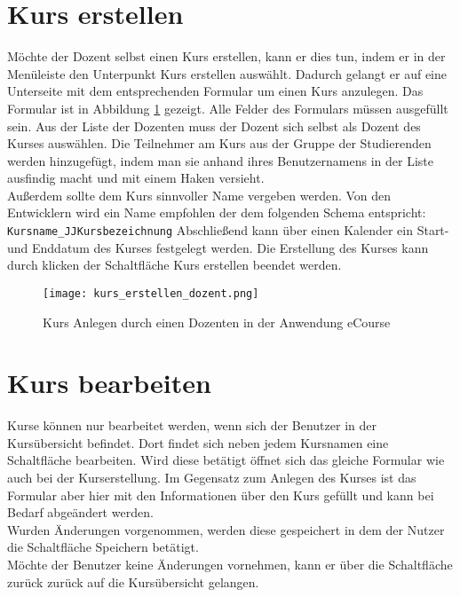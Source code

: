 \section{Kurs erstellen}
Möchte der Dozent selbst einen Kurs erstellen, kann er dies tun, indem er in der Menüleiste den Unterpunkt \glqq Kurs erstellen\grqq{} auswählt. Dadurch gelangt er auf eine Unterseite mit dem entsprechenden Formular um einen Kurs anzulegen. Das Formular ist in Abbildung \ref{fib:kurs_anlegen} gezeigt. Alle Felder des Formulars müssen ausgefüllt sein. Aus der Liste der Dozenten muss der Dozent sich selbst als Dozent des Kurses auswählen.
Die Teilnehmer am Kurs aus der Gruppe der Studierenden werden hinzugefügt, indem man sie anhand ihres Benutzernamens in der Liste ausfindig macht und mit einem Haken versieht. \\
Außerdem sollte dem Kurs sinnvoller Name vergeben werden. Von den Entwicklern wird ein Name empfohlen der dem folgenden Schema entspricht: \\
\verb/Kursname_JJKursbezeichnung/
Abschließend kann über einen Kalender ein Start- und Enddatum des Kurses festgelegt werden. 
Die Erstellung des Kurses kann durch klicken der Schaltfläche \glqq Kurs erstellen\grqq{} beendet werden.

\begin{figure}[h]
\centering
\texttt{[image: kurs\_erstellen\_dozent.png]}
\caption{Kurs Anlegen durch einen Dozenten in der Anwendung eCourse}
\label{fib:kurs_anlegen}
\end{figure}
\section{Kurs bearbeiten}
Kurse können nur bearbeitet werden, wenn sich der Benutzer in der Kursübersicht befindet. Dort findet sich neben jedem Kursnamen eine Schaltfläche \glqq bearbeiten\grqq . Wird diese betätigt öffnet sich das gleiche Formular wie auch bei der Kurserstellung. Im Gegensatz zum Anlegen des Kurses ist das Formular aber hier mit den Informationen über den Kurs gefüllt und kann bei Bedarf abgeändert werden.\\
Wurden Änderungen vorgenommen, werden diese gespeichert in dem der Nutzer die Schaltfläche \glqq Speichern\grqq{} betätigt.\\
Möchte der Benutzer keine Änderungen vornehmen, kann er über die Schaltfläche \glqq zurück\grqq{} zurück auf die Kursübersicht gelangen.


